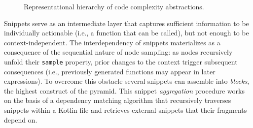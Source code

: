 \begin{figure}[htp]
\centering
{}

 \caption{Representational hierarchy of code complexity abstractions.}
 \label{fig:code-hierarchy}
\end{figure}

Snippets serve as an intermediate layer that captures sufficient information to be individually actionable (i.e., a function that can be called), but not enough to be
context-independent.
The interdependency of snippets materializes as a consequence of
the sequential nature of node sampling: as nodes recursively unfold
their \texttt{sample} property, prior changes to the context
trigger subsequent consequences (i.e., previously generated 
functions may appear in later expressions).
To overcome this obstacle several snippets can assemble into \textit{blocks},
the highest construct of the pyramid.
This snippet \textit{aggregation} procedure works on the basis of a dependency matching
algorithm that recursively traverses snippets within a Kotlin file and retrieves
external snippets that their fragments depend on.


